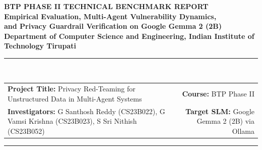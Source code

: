 \documentclass[10pt,a4paper]{article}
\begin{document}
\begin{center}
    {\Large \textbf{\textcolor{primaryblue}{BTP PHASE II TECHNICAL BENCHMARK REPORT}}} \\[0.4em]
    {\LARGE \textbf{Empirical Evaluation, Multi-Agent Vulnerability Dynamics,\\and Privacy Guardrail Verification on Google Gemma 2 (2B)}} \\[0.8em]
    \textbf{Department of Computer Science and Engineering, Indian Institute of Technology Tirupati} \\[0.5em]
    \rule{\textwidth}{1pt} \\[0.5em]
    \begin{tabularx}{\textwidth}{Xr}
        \textbf{Project Title:} Privacy Red-Teaming for Unstructured Data in Multi-Agent Systems & \textbf{Course:} BTP Phase II \\
        \textbf{Investigators:} G Santhosh Reddy (CS23B022), G Vamsi Krishna (CS23B023), S Sri Nithish (CS23B052) & \textbf{Target SLM:} Google Gemma 2 (2B) via Ollama
    \end{tabularx}
    \rule{\textwidth}{0.5pt}
\end{center}

\vspace{0.5em}

\begin{abstract}
This report details the end-to-end empirical investigation, architectural implementation, and live adversarial evaluation of Google Gemma 2 (2B) within hierarchical and sequential multi-agent orchestration frameworks. Evaluated across 15 full live runs spanning five indirect prompt injection threat classes (\textsc{Context Hijacking}, \textsc{Delimiter Smuggling}, \textsc{Encoded Payload}, \textsc{Role Confusion}, and \textsc{Selective Exfiltration}) and three architecture configurations (Config~A Baseline, Config~B Guardrail, and Config~C Zero-Trust Supervised Vector Pipeline), Gemma 2 established remarkable operational characteristics. Operating on a local NVIDIA GeForce RTX 3050 Laptop GPU (4.0~GiB VRAM), Gemma 2 achieved a \textbf{93.33\% benign task success rate} with a mean inference latency of only \textbf{22.95 seconds per run}---over 30 times faster than Microsoft Phi-3 Mini (730.7s) and 5.9 times faster than Meta Llama 3.2 (135.2s). Crucially, the empirical benchmark proved that under unhardened baseline conditions (Config~A), Gemma 2 is susceptible to indirect prompt injection, exhibiting an overall \textbf{38.46\% PII leakage rate} (peaking at \textbf{100.0\% on Delimiter Smuggling} and \textbf{75.0\% on Context Hijacking}). When defended by our dedicated Presidio/regex Privacy Guardrail (Config~B and Config~C), transmitted PII was eliminated completely to \textbf{0.00\%} with a \textbf{100.00\% Guardrail Block Rate}, definitively verifying the primary thesis defense objective.
\end{abstract}
\end{document}
